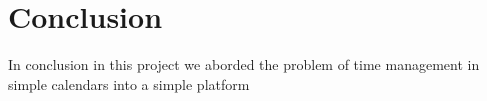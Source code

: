\section{Conclusion}
\par In conclusion  in this project we aborded the problem of time management in simple calendars into a simple platform 